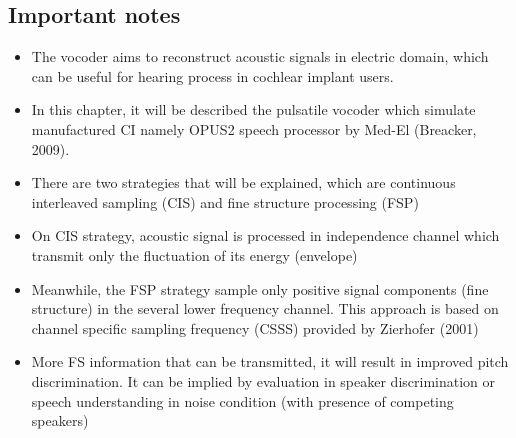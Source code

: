 
\subsection{Important notes}
\begin{itemize}
	\item The vocoder aims to reconstruct acoustic signals in electric domain, which can be useful for hearing process in cochlear implant users.
	
	\item In this chapter, it will be described the pulsatile vocoder which simulate manufactured CI namely OPUS2 speech processor by Med-El (Breacker, 2009). 
	
	\item There are two strategies that will be explained, which are continuous interleaved sampling (CIS) and fine structure processing (FSP)
	
	\item On CIS strategy, acoustic signal is processed in independence channel which transmit only the fluctuation of its energy (envelope)
	
	\item Meanwhile, the FSP strategy sample only positive signal components (fine structure) in the several lower frequency channel. This approach is based on channel specific sampling frequency (CSSS) provided by Zierhofer (2001)
	
	\item More FS information that can be transmitted, it will result in improved pitch discrimination. It can be implied by evaluation in speaker discrimination or speech understanding in noise condition (with presence of competing speakers)
	
\end{itemize}

